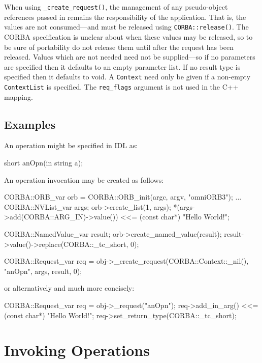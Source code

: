 \documentclass[11pt,twoside,a4paper]{book}
\newcommand{\type}[1]{\texttt{#1}}
\newcommand{\code}[1]{\texttt{#1}}
\newcommand{\op}[1]{\texttt{#1()}}
\begin{document}
When using \op{\_create\_request}, the management of any pseudo-object
references passed in remains the responsibility of the
application. That is, the values are not consumed---and must be
released using \op{CORBA::release}. The CORBA specification is unclear
about when these values may be released, so to be sure of portability
do not release them until after the request has been released.  Values
which are not needed need not be supplied---so if no parameters are
specified then it defaults to an empty parameter list. If no result
type is specified then it defaults to void. A \type{Context} need only
be given if a non-empty \type{ContextList} is specified. The
\code{req\_flags} argument is not used in the C++ mapping.


\subsection{Examples}

An operation might be specified in IDL as:

\begin{idllisting}
short anOpn(in string a);
\end{idllisting}

\noindent An operation invocation may be created as follows:

\begin{cxxlisting}
CORBA::ORB_var orb = CORBA::ORB_init(argc, argv, "omniORB3");
...
CORBA::NVList_var args;
orb->create_list(1, args);
*(args->add(CORBA::ARG_IN)->value()) <<= (const char*) "Hello World!";

CORBA::NamedValue_var result;
orb->create_named_value(result);
result->value()->replace(CORBA::_tc_short, 0);

CORBA::Request_var req = obj->_create_request(CORBA::Context::_nil(),
                                        "anOpn", args, result, 0);
\end{cxxlisting}

\noindent or alternatively and much more concisely:

\begin{cxxlisting}
CORBA::Request_var req = obj->_request("anOpn");
req->add_in_arg() <<= (const char*) "Hello World!";
req->set_return_type(CORBA::_tc_short);
\end{cxxlisting}


\section{Invoking Operations}
\label{dii_invoke}
\end{document}

